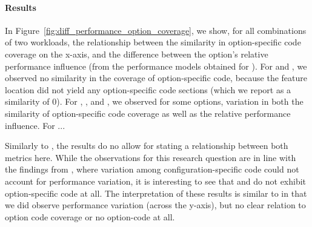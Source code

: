 {\color{blue!50!black}
\paragraph*{Results}
In Figure~\ref{fig:diff_performance_option_coverage}, we show, for all combinations of two workloads, the relationship between the similarity in option-specific code coverage on the x-axis, and the difference between the option's relative performance influence (from the performance models obtained for ). For \batik and \dconvert, we observed no similarity in the coverage of option-specific code, because the feature location did not yield any option-specific code sections (which we report as a similarity of $0$). For \htwo, \jumper, and \jadx, we observed for some options, variation in both the similarity of option-specific code coverage as well as the relative performance influence. {\color{red} For \kanzi ...}

Similarly to , the results do no allow for stating a relationship between both metrics here. While the observations for this research question are in line with the findings from , where variation among configuration-specific code could not account for performance variation, it is interesting to see that \batik and \dconvert do not exhibit option-specific code at all. The interpretation of these results is similar to  in that we did observe performance variation (across the y-axis), but no clear relation to option code coverage or no option-code at all.
}\\


